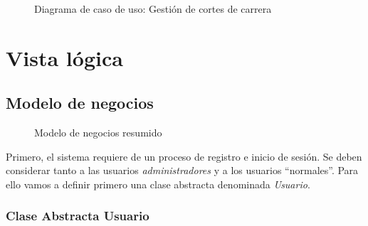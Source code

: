 \documentclass[12pt,a4paper]{article}
\begin{document}
\begin{figure}[H]
  \centering
  \caption{Diagrama de caso de uso: Gestión de cortes de carrera}
  \label{fig:diagusoGestionCarreras}
\end{figure}

\section{Vista lógica}

\subsection{Modelo de negocios}

\begin{figure}[H]
  \centering
  \caption{Modelo de negocios resumido}
  \label{fig:ModeloNegResumido}
\end{figure}

Primero, el sistema requiere de un proceso de registro e inicio de sesión. Se deben considerar tanto a las usuarios \textit{administradores} y a los usuarios ``normales''. Para ello vamos a definir primero una clase abstracta denominada \textit{Usuario}.

\subsubsection*{Clase Abstracta Usuario}
\end{document}
